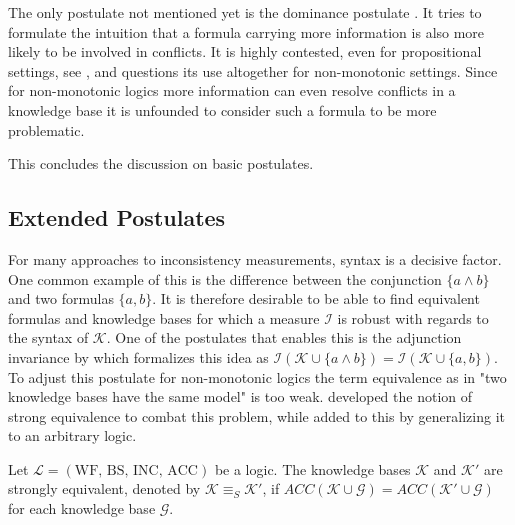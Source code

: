 The only postulate not mentioned yet is the dominance postulate \cite{hunter_measure_2010}. It tries to formulate the intuition that a formula carrying more information is also more likely to be involved in conflicts. It is highly contested, even for propositional settings, see \cite{ferme_revisiting_2014}, and \cite{ulbricht_measuring_2018} questions its use altogether for non-monotonic settings. Since for non-monotonic logics more information can even resolve conflicts in a knowledge base it is unfounded to consider such a formula to be more problematic.

This concludes the discussion on basic postulates.

\subsection{Extended Postulates}
For many approaches to inconsistency measurements, syntax is a decisive factor. One common example of this is the difference between the conjunction \(\{a \land b\}\) and two formulas \(\{a, b\}\). It is therefore desirable to be able to find equivalent formulas and knowledge bases for which a measure \(\mathcal{I}\) is robust with regards to the syntax of \(\mathcal{K}\). One of the postulates that enables this is the adjunction invariance by \cite{ferme_revisiting_2014} which formalizes this idea as \(\mathcal{I}(\mathcal{K} \cup \{a \land b\}) = \mathcal{I}(\mathcal{K} \cup \{a, b\})\).
To adjust this postulate for non-monotonic logics the term equivalence as in "two knowledge bases have the same model" is too weak. \cite{lifschitz_strongly_2001} developed the notion of strong equivalence to combat this problem, while \cite{brewka_strong_2019} added to this by generalizing it to an arbitrary logic.

\begin{definition}
    Let \(\mathcal{L} = (\text{WF, BS, INC, ACC})\) be a logic. The knowledge bases \(\mathcal{K}\) and \(\mathcal{K}'\) are strongly equivalent, denoted by \(\mathcal{K} \equiv_S  \mathcal{K}'\), if \(ACC(\mathcal{K} \cup \mathcal{G}) = ACC(\mathcal{K}' \cup \mathcal{G})\) for each knowledge base \(\mathcal{G}\).
\end{definition}


